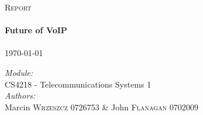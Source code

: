 \begin{titlepage}
 
\begin{center}
 
 
 
 
\textsc{\LARGE Report}\\[3.5cm]
 
 
\HRule \\[0.6cm]
{ \huge \bfseries Future of VoIP}\\[0.4cm]
 
\HRule \\[4.0cm]
 {\large \today}\\[9.0cm]

\begin{flushleft} \large
\emph{Module:}\\
CS4218 - Telecommunications Systems 1
\\[0.4cm]
\emph{Authors:}\\
Marcin \textsc{Wrzeszcz} 0726753 \& John \textsc{Flanagan} 0702009
\end{flushleft}

 
\vfill
 

 
\end{center}
 
\end{titlepage}
